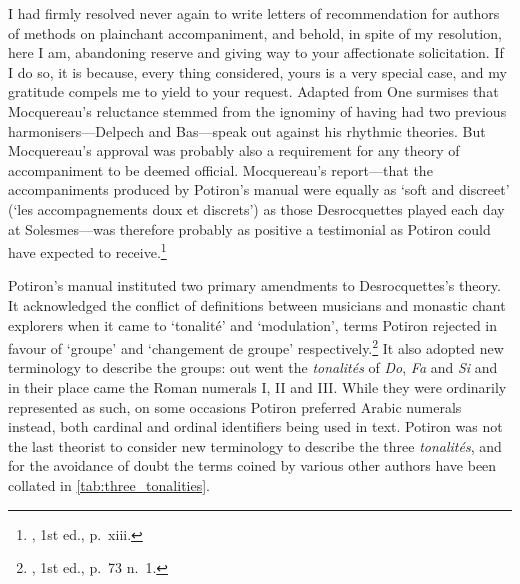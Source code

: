   {}
{I had firmly resolved never again to write letters of recommendation for authors of methods on plainchant accompaniment, and behold, in spite of my resolution, here I am, abandoning reserve and giving way to your affectionate solicitation. If I do so, it is because, every thing considered, yours is a very special case, and my gratitude compels me to yield to your request.}
  {Adapted from \cite[vi]{PotironTreatiseAccompanimentGregorian1933}}
%
\noindent
One surmises that Mocquereau's reluctance stemmed from the ignominy of having had two previous harmonisers---Delpech and Bas---speak out against his rhythmic theories.
But Mocquereau's approval was probably also a requirement for any theory of accompaniment to be deemed official.
Mocquereau's report---that the accompaniments produced by Potiron's manual were equally as `soft and discreet' (`les accompagnements doux et discrets') as those Desrocquettes played each day at Solesmes---was therefore probably as positive a testimonial as Potiron could have expected to receive.\footnote{\cite{PotironCoursaccompagnementchant1925}, 1st ed., p.~xiii.}

Potiron's manual instituted two primary amendments to Desrocquettes's theory.
It acknowledged the conflict of definitions between musicians and monastic chant explorers when it came to `tonalité' and `modulation', terms Potiron rejected in favour of `groupe' and `changement de groupe' respectively.\footnote{\cite{PotironCoursaccompagnementchant1925}, 1st ed., p.~73 n.~1.}
It also adopted new terminology to describe the groups: out went the \emph{tonalités} of \emph{Do}, \emph{Fa} and \emph{Si}\kern 1pt\flat{} and in their place came the Roman numerals I, II and III.
While they were ordinarily represented as such, on some occasions Potiron preferred Arabic numerals instead, both cardinal and ordinal identifiers being used in text.
Potiron was not the last theorist to consider new terminology to describe the three \emph{tonalités}, and for the avoidance of doubt the terms coined by various other authors have been collated in \cref{tab:three_tonalities}.

